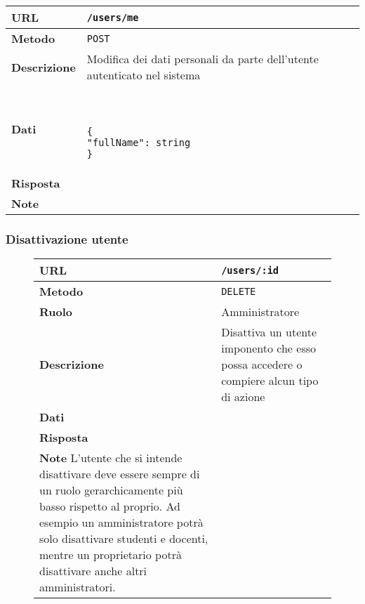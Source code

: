         \begin{tabular}{|l|l|} 
            \hline
            \textbf{URL} & \texttt{/users/me} \\ \hline
            \textbf{Metodo} & \texttt{POST} \\ \hline
            \textbf{Descrizione} & 
                Modifica dei dati personali da parte dell'utente
                autenticato nel sistema \\ \hline
            \textbf{Dati} & \
                \begin{lstlisting}[basicstyle={\ttfamily}]
{
"fullName": string
}
                \end{lstlisting} \\ \hline
            \textbf{Risposta} & \\ \hline
            \textbf{Note} & \\ \hline
        \end{tabular}

    \subsubsection{Disattivazione utente}

        \begin{figure}
            \begin{tabular}{|l|l|} 
                \hline
                \textbf{URL} & \texttt{/users/:id} \\ \hline
                \textbf{Metodo} & \texttt{DELETE} \\ \hline
                \textbf{Ruolo} & Amministratore \\ \hline
                \textbf{Descrizione} & 
                    Disattiva un utente imponento che esso possa
                    accedere o compiere alcun tipo di azione \\ \hline
                \textbf{Dati} & \\ \hline
                \textbf{Risposta} & \\ \hline
                \textbf{Note} 
                    L'utente che si intende disattivare deve essere sempre
                    di un ruolo gerarchicamente più basso rispetto al proprio.
                    Ad esempio un amministratore potrà solo disattivare studenti
                    e docenti, mentre un proprietario potrà disattivare anche 
                    altri amministratori. & \\ \hline
            \end{tabular}
        \end{figure}


